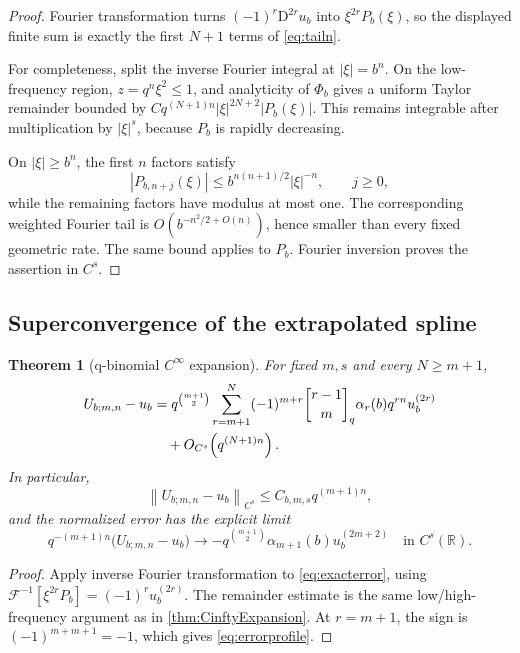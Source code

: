 \documentclass[11pt]{article}
\newtheorem{theorem}{Theorem}[section]
\theoremstyle{definition}
\theoremstyle{remark}
\newcommand{\R}{\mathbb{R}}
\newcommand{\D}{\mathrm{D}}
\newcommand{\norm}[1]{\left\lVert #1\right\rVert}
\newcommand{\abs}[1]{\left\lvert #1\right\rvert}
\newcommand{\qbinom}[2]{\genfrac{[}{]}{0pt}{}{#1}{#2}_{q}}
\begin{document}
\begin{proof}
Fourier transformation turns \((-1)^r\D^{2r}u_b\) into
\(\xi^{2r}P_b(\xi)\), so the displayed finite sum is exactly the first
\(N+1\) terms of \eqref{eq:tailn}.

For completeness, split the inverse Fourier integral at \(\abs\xi=b^n\). On the
low-frequency region, \(z=q^n\xi^2\leq1\), and analyticity of \(\Phi_b\) gives a
uniform Taylor remainder bounded by
\(Cq^{(N+1)n}\abs\xi^{2N+2}\abs{P_b(\xi)}\). This remains integrable after
multiplication by \(\abs\xi^s\), because \(P_b\) is rapidly decreasing.

On \(\abs\xi\geq b^n\), the first \(n\) factors satisfy
\[
 \abs{P_{b,n+j}(\xi)}\leq
 b^{n(n+1)/2}\abs\xi^{-n},\qquad j\geq0,
\]
while the remaining factors have modulus at most one. The corresponding weighted
Fourier tail is \(O(b^{-n^2/2+O(n)})\), hence smaller than every fixed geometric
rate. The same bound applies to \(P_b\). Fourier inversion proves the assertion
in \(C^s\).
\end{proof}

\subsection{Superconvergence of the extrapolated spline}

\begin{theorem}[q-binomial \(C^\infty\) expansion]
\label{thm:Uexpansion}
For fixed \(m,s\) and every \(N\geq m+1\),
\begin{align}
 U_{b;m,n}-u_b
 &=q^{\binom{m+1}{2}}
 \sum_{r=m+1}^{N}(-1)^{m+r}
 \qbinom{r-1}{m}\alpha_r(b)q^{rn}u_b^{(2r)}
 \notag\\
 &\quad+O_{C^s}\!\left(q^{(N+1)n}\right).
 \label{eq:Uallorder}
\end{align}
In particular,
\begin{equation}
 \norm{U_{b;m,n}-u_b}_{C^s}
 \leq C_{b,m,s}q^{(m+1)n},
 \label{eq:Csuper}
\end{equation}
and the normalized error has the explicit limit
\begin{equation}
 q^{-(m+1)n}\bigl(U_{b;m,n}-u_b\bigr)
 \longrightarrow
 -q^{\binom{m+1}{2}}\alpha_{m+1}(b)u_b^{(2m+2)}
 \quad\text{in }C^s(\R).
 \label{eq:errorprofile}
\end{equation}
\end{theorem}

\begin{proof}
Apply inverse Fourier transformation to \eqref{eq:exacterror}, using
\(\mathcal F^{-1}[\xi^{2r}P_b]=(-1)^ru_b^{(2r)}\). The remainder estimate is
the same low/high-frequency argument as in \cref{thm:CinftyExpansion}. At
\(r=m+1\), the sign is \((-1)^{m+m+1}=-1\), which gives
\eqref{eq:errorprofile}.
\end{proof}
\end{document}
